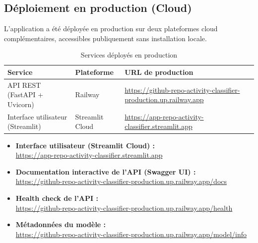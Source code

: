 \documentclass[12pt,a4paper]{article}
\begin{document}
\subsection{Déploiement en production (Cloud)}

L'application a été déployée en production sur deux plateformes cloud complémentaires,
accessibles publiquement sans installation locale.

\begin{table}[H]
  \centering
  \caption{Services déployés en production}
  \label{tab:deploy_cloud}
  \begin{tabularx}{\linewidth}{llL}
    \toprule
    \textbf{Service} & \textbf{Plateforme} & \textbf{URL de production} \\
    \midrule
    API REST (FastAPI + Uvicorn) & Railway &
      \url{https://github-repo-activity-classifier-production.up.railway.app} \\
    Interface utilisateur (Streamlit) & Streamlit Cloud &
      \url{https://app-repo-activity-classifier.streamlit.app} \\
    \bottomrule
  \end{tabularx}
\end{table}

\begin{keybox}
\begin{itemize}[noitemsep]
  \item \textbf{Interface utilisateur (Streamlit Cloud) :}\\
        \url{https://app-repo-activity-classifier.streamlit.app}
  \item \textbf{Documentation interactive de l'API (Swagger UI) :}\\
        \url{https://github-repo-activity-classifier-production.up.railway.app/docs}
  \item \textbf{Health check de l'API :}\\
        \url{https://github-repo-activity-classifier-production.up.railway.app/health}
  \item \textbf{Métadonnées du modèle :}\\
        \url{https://github-repo-activity-classifier-production.up.railway.app/model/info}
\end{itemize}
\end{keybox}
\end{document}
